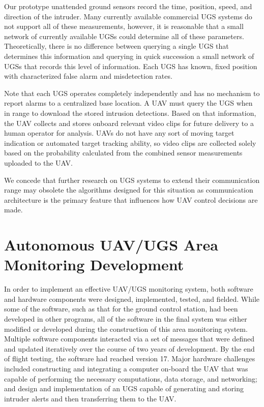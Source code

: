 \documentclass[letterpaper, 12 pt, conference]{ieeeconf}  %
\theoremstyle{definition}
\begin{document}
Our prototype unattended ground sensors record the time, position, speed, and direction 
of the intruder. Many currently available commercial UGS systems do not support all of these measurements,
however, it is reasonable that a small network of currently available
UGSs could determine all of these parameters. Theoretically, there is no
difference between querying a single UGS that determines this information and
querying in quick succession a small network of UGSs that records this level of
information. Each UGS has known, fixed position with characterized false alarm and
misdetection rates.

Note that each UGS operates completely independently and has no mechanism to report alarms to a
centralized base location. A UAV must query the UGS when in range to download
the stored intrusion detections. Based on that information, the UAV collects and stores onboard
relevant video clips for future delivery to a human operator for analysis. UAVs do not have any
sort of moving target indication or automated target tracking ability, so video clips are collected solely
based on the probability calculated from the combined sensor measurements uploaded to the UAV.

We concede that further research on UGS systems to extend their communication
range may obsolete the algorithms designed for this situation as communication
architecture is the primary feature that influences how UAV control decisions are made.


\section{Autonomous UAV/UGS Area Monitoring Development} \label{sec:hardware}
In order to implement an effective UAV/UGS monitoring system, both software and hardware components were designed, implemented, tested, and fielded. While some of the software, such as that for the ground control station, had been developed in other programs, all of the software in the final system was either modified or developed during the construction of this area monitoring system. Multiple software components interacted via a set of messages that were defined and updated iteratively over the course of two years of development. By the end of flight testing, the software had reached version 17. Major hardware challenges included constructing and integrating a computer on-board the UAV that was capable of performing the necessary computations, data storage, and networking; and design and implementation of an UGS capable of generating and storing intruder alerts and then transferring them to the UAV.
\end{document}
